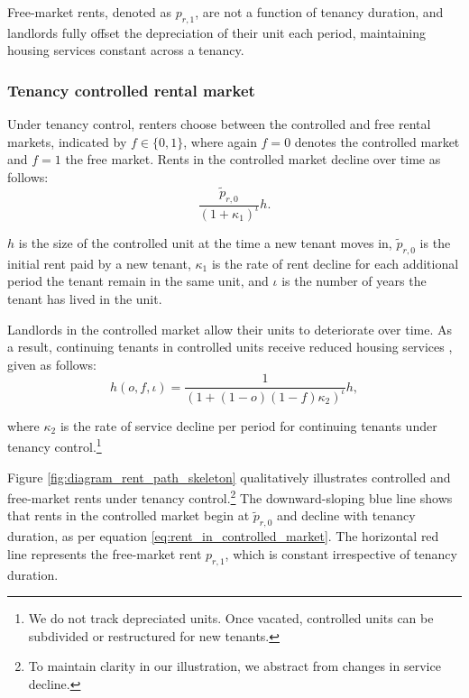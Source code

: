 \documentclass[parskip=full]{article}
\begin{document}
Free-market rents, denoted as $p_{r,1}$, are not a function of tenancy duration, and landlords fully offset the depreciation of their unit each period, maintaining housing services constant across a tenancy.

\subsubsection{Tenancy controlled rental market}

Under tenancy control, renters choose between the controlled and free rental markets, indicated by $f \in \{0,1\}$, where again $f=0$ denotes the controlled market and $f=1$ the free market. Rents in the controlled market decline over time as follows:
\begin{equation}\label{eq:rent_in_controlled_market}
\frac{\tilde{p}_{r,0}}{(1+\kappa_{1})^{\iota}} h.
\end{equation} 

\noindent $h$ is the size of the controlled unit at the time a new tenant moves in, $\tilde{p}_{r,0}$ is the initial rent paid by a new tenant, $\kappa_{1}$ is the rate of rent decline for each additional period the tenant remain in the same unit, and $\iota$ is the number of years the tenant has lived in the unit.

Landlords in the controlled market allow their units to deteriorate over time. As a result, continuing tenants in controlled units receive reduced housing services \citep{gl-1990,murray_et_al-1991}, given as follows:
\begin{equation}
h(o,f,\iota)=\frac{1}{(1+(1-o)(1-f)\kappa_{2})^{\iota}} h,
\end{equation}
 
\noindent where $\kappa_{2}$ is the rate of service decline per period for continuing tenants under tenancy control.\footnote{We do not track depreciated units. Once vacated, controlled units can be subdivided or restructured for new tenants.}

Figure \ref{fig:diagram_rent_path_skeleton} qualitatively illustrates controlled and free-market rents under tenancy control.\footnote{To maintain clarity in our illustration, we abstract from changes in service decline.} The downward-sloping blue line shows that rents in the controlled market begin at $\tilde{p}_{r,0}$ and decline with tenancy duration, as per equation \eqref{eq:rent_in_controlled_market}. The horizontal red line represents the free-market rent $p_{r,1}$, which is constant irrespective of tenancy duration. 
\end{document}
